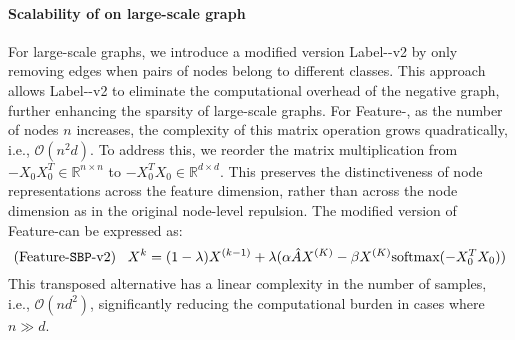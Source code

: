 \begin{table}[htbp]
\centering
\caption{Estimated training time of \ours on Cora dataset. All experiments are run under 2 layers. s is the abbreviation for second. Precompute time is the aggregation time across layers, train time is the update time of the SGC weight $W$, total time is the sum of them.}
\label{tab: time sbp}
\end{table}


\paragraph{Scalability of \ours on large-scale graph}
For large-scale graphs, we introduce a modified version Label-\ours-v2 by only removing edges when pairs of nodes belong to different classes.
This approach allows Label-\ours-v2 to eliminate the computational overhead of the negative graph, further enhancing the sparsity of large-scale graphs.
For Feature-\ours, as the number of nodes $n$ increases, the complexity of this matrix operation grows quadratically, i.e., $\mathcal{O}(n^2d)$.
To address this, we reorder the matrix multiplication from $-X_{0}X_{0}^T \in \mathbb{R}^{n\times n}$ to $-X_{0}^TX_{0} \in \mathbb{R}^{d\times d}$. This preserves the distinctiveness of node representations across the feature dimension, rather than across the node dimension as in the original node-level repulsion.
The modified version of Feature-\ours can be expressed as:
\begin{equation}
 (\text{Feature-\ours-v2})\,\,\,\,\,   X^{k}=(1-\lambda)X^{(k-1)}+\lambda(\alpha \hat{A}X^{(K)} - \beta X^{(K)} \text{softmax}(-X_{0}^TX_{0}))
\end{equation}
This transposed alternative has a linear complexity in the number of samples, i.e., $\mathcal{O}(nd^2)$, significantly reducing the computational burden in cases where $n \gg d$.

